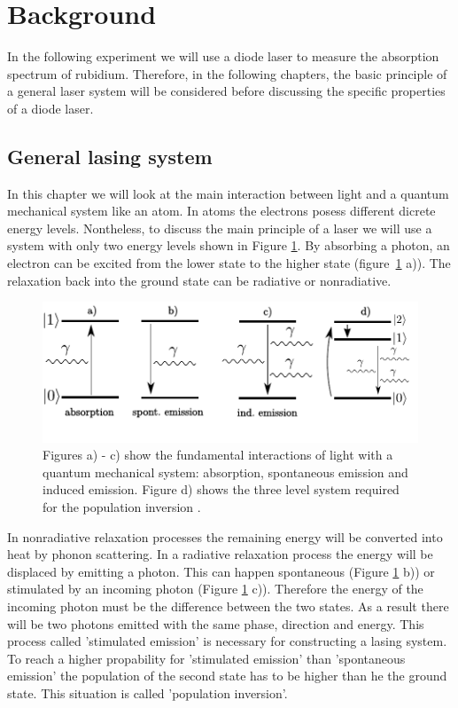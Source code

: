 \section{Background}

In the following experiment we will use a diode laser to measure the absorption
spectrum of rubidium. Therefore, in the following chapters, the basic principle
of a general laser system will be considered before discussing the specific
properties of a diode laser.

\subsection{General lasing system}

In this chapter we will look at the main interaction between light and a
quantum mechanical system like an atom. In atoms the electrons posess different
dicrete energy levels. Nontheless, to discuss the main principle of a laser
we will use a system with only two energy levels shown in Figure \ref{fig:twolevelsystem}.
By absorbing a photon, an electron can be excited from the lower state to the
higher state (figure~\ref{fig:twolevelsystem} a)).
The relaxation back into the ground state can be radiative or
nonradiative.
\begin{figure}
  \centering
  \includegraphics[width = \textwidth]{Pics/energyscheme.pdf}
  \caption{Figures a) - c) show the fundamental interactions of light with a
  quantum mechanical system: absorption, spontaneous emission and induced emission.
  Figure d) shows the three level system required for the population inversion
  \cite{steven}.}%
  \label{fig:twolevelsystem}
\end{figure}
In nonradiative relaxation processes the remaining energy will be converted into
heat by phonon scattering. In a radiative relaxation process the energy will
be displaced by emitting a photon. This can happen spontaneous (Figure \ref{fig:twolevelsystem} b))
or stimulated by an incoming photon (Figure \ref{fig:twolevelsystem} c)).
Therefore the energy of the incoming photon must be the difference between the
two states. As a result there will be two photons emitted with the same phase,
direction and energy. This process called 'stimulated emission' is necessary
for constructing a lasing system. To reach a higher propability for 'stimulated emission'
than 'spontaneous emission' the population of the second state has to be higher
than he the ground state. This situation is called 'population inversion'.


